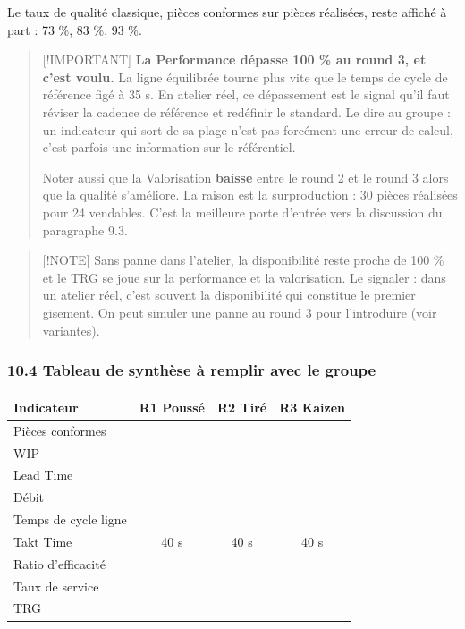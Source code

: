 \documentclass[
]{article}
\newcounter{none} %
\begin{document}
Le taux de qualité classique, pièces conformes sur pièces réalisées,
reste affiché à part : 73 \%, 83 \%, 93 \%.

\begin{quote}
{[}!IMPORTANT{]} \textbf{La Performance dépasse 100 \% au round 3, et
c'est voulu.} La ligne équilibrée tourne plus vite que le temps de cycle
de référence figé à 35 s. En atelier réel, ce dépassement est le signal
qu'il faut réviser la cadence de référence et redéfinir le standard. Le
dire au groupe : un indicateur qui sort de sa plage n'est pas forcément
une erreur de calcul, c'est parfois une information sur le référentiel.

Noter aussi que la Valorisation \textbf{baisse} entre le round 2 et le
round 3 alors que la qualité s'améliore. La raison est la surproduction
: 30 pièces réalisées pour 24 vendables. C'est la meilleure porte
d'entrée vers la discussion du paragraphe 9.3.
\end{quote}

\begin{quote}
{[}!NOTE{]} Sans panne dans l'atelier, la disponibilité reste proche de
100 \% et le TRG se joue sur la performance et la valorisation. Le
signaler : dans un atelier réel, c'est souvent la disponibilité qui
constitue le premier gisement. On peut simuler une panne au round 3 pour
l'introduire (voir variantes).
\end{quote}

\subsubsection{10.4 Tableau de synthèse à remplir avec le
groupe}\label{tableau-de-synthuxe8se-uxe0-remplir-avec-le-groupe}

{\def\LTcaptype{none} %
\begin{longtable}[]{@{}lccc@{}}
\toprule\noalign{}
Indicateur & R1 Poussé & R2 Tiré & R3 Kaizen \\
\midrule\noalign{}
\endhead
\bottomrule\noalign{}
\endlastfoot
Pièces conformes & & & \\
WIP & & & \\
Lead Time & & & \\
Débit & & & \\
Temps de cycle ligne & & & \\
Takt Time & 40 s & 40 s & 40 s \\
Ratio d'efficacité & & & \\
Taux de service & & & \\
TRG & & & \\
\end{longtable}
}
\end{document}
